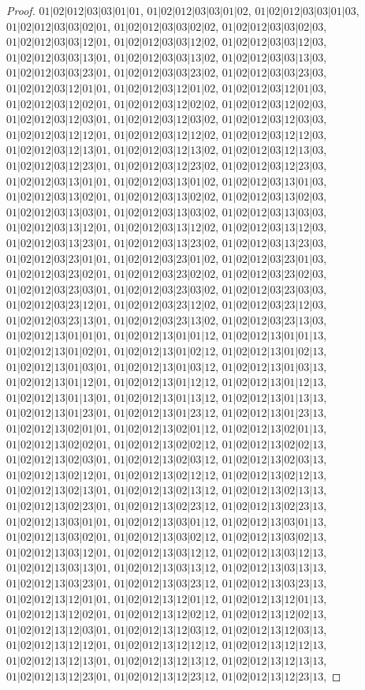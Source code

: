 \documentclass[12pt]{article}
\theoremstyle{plain}
\theoremstyle{definition}
\theoremstyle{remark}
\begin{document}
\begin{proof}
$01|02|012|03|03|01|01$, $01|02|012|03|03|01|02$, $01|02|012|03|03|01|03$, $01|02|012|03|03|02|01$, $01|02|012|03|03|02|02$, $01|02|012|03|03|02|03$, $01|02|012|03|03|12|01$, $01|02|012|03|03|12|02$, $01|02|012|03|03|12|03$, $01|02|012|03|03|13|01$, $01|02|012|03|03|13|02$, $01|02|012|03|03|13|03$, $01|02|012|03|03|23|01$, $01|02|012|03|03|23|02$, $01|02|012|03|03|23|03$, $01|02|012|03|12|01|01$, $01|02|012|03|12|01|02$, $01|02|012|03|12|01|03$, $01|02|012|03|12|02|01$, $01|02|012|03|12|02|02$, $01|02|012|03|12|02|03$, $01|02|012|03|12|03|01$, $01|02|012|03|12|03|02$, $01|02|012|03|12|03|03$, $01|02|012|03|12|12|01$, $01|02|012|03|12|12|02$, $01|02|012|03|12|12|03$, $01|02|012|03|12|13|01$, $01|02|012|03|12|13|02$, $01|02|012|03|12|13|03$, $01|02|012|03|12|23|01$, $01|02|012|03|12|23|02$, $01|02|012|03|12|23|03$, $01|02|012|03|13|01|01$, $01|02|012|03|13|01|02$, $01|02|012|03|13|01|03$, $01|02|012|03|13|02|01$, $01|02|012|03|13|02|02$, $01|02|012|03|13|02|03$, $01|02|012|03|13|03|01$, $01|02|012|03|13|03|02$, $01|02|012|03|13|03|03$, $01|02|012|03|13|12|01$, $01|02|012|03|13|12|02$, $01|02|012|03|13|12|03$, $01|02|012|03|13|23|01$, $01|02|012|03|13|23|02$, $01|02|012|03|13|23|03$, $01|02|012|03|23|01|01$, $01|02|012|03|23|01|02$, $01|02|012|03|23|01|03$, $01|02|012|03|23|02|01$, $01|02|012|03|23|02|02$, $01|02|012|03|23|02|03$, $01|02|012|03|23|03|01$, $01|02|012|03|23|03|02$, $01|02|012|03|23|03|03$, $01|02|012|03|23|12|01$, $01|02|012|03|23|12|02$, $01|02|012|03|23|12|03$, $01|02|012|03|23|13|01$, $01|02|012|03|23|13|02$, $01|02|012|03|23|13|03$, $01|02|012|13|01|01|01$, $01|02|012|13|01|01|12$, $01|02|012|13|01|01|13$, $01|02|012|13|01|02|01$, $01|02|012|13|01|02|12$, $01|02|012|13|01|02|13$, $01|02|012|13|01|03|01$, $01|02|012|13|01|03|12$, $01|02|012|13|01|03|13$, $01|02|012|13|01|12|01$, $01|02|012|13|01|12|12$, $01|02|012|13|01|12|13$, $01|02|012|13|01|13|01$, $01|02|012|13|01|13|12$, $01|02|012|13|01|13|13$, $01|02|012|13|01|23|01$, $01|02|012|13|01|23|12$, $01|02|012|13|01|23|13$, $01|02|012|13|02|01|01$, $01|02|012|13|02|01|12$, $01|02|012|13|02|01|13$, $01|02|012|13|02|02|01$, $01|02|012|13|02|02|12$, $01|02|012|13|02|02|13$, $01|02|012|13|02|03|01$, $01|02|012|13|02|03|12$, $01|02|012|13|02|03|13$, $01|02|012|13|02|12|01$, $01|02|012|13|02|12|12$, $01|02|012|13|02|12|13$, $01|02|012|13|02|13|01$, $01|02|012|13|02|13|12$, $01|02|012|13|02|13|13$, $01|02|012|13|02|23|01$, $01|02|012|13|02|23|12$, $01|02|012|13|02|23|13$, $01|02|012|13|03|01|01$, $01|02|012|13|03|01|12$, $01|02|012|13|03|01|13$, $01|02|012|13|03|02|01$, $01|02|012|13|03|02|12$, $01|02|012|13|03|02|13$, $01|02|012|13|03|12|01$, $01|02|012|13|03|12|12$, $01|02|012|13|03|12|13$, $01|02|012|13|03|13|01$, $01|02|012|13|03|13|12$, $01|02|012|13|03|13|13$, $01|02|012|13|03|23|01$, $01|02|012|13|03|23|12$, $01|02|012|13|03|23|13$, $01|02|012|13|12|01|01$, $01|02|012|13|12|01|12$, $01|02|012|13|12|01|13$, $01|02|012|13|12|02|01$, $01|02|012|13|12|02|12$, $01|02|012|13|12|02|13$, $01|02|012|13|12|03|01$, $01|02|012|13|12|03|12$, $01|02|012|13|12|03|13$, $01|02|012|13|12|12|01$, $01|02|012|13|12|12|12$, $01|02|012|13|12|12|13$, $01|02|012|13|12|13|01$, $01|02|012|13|12|13|12$, $01|02|012|13|12|13|13$, $01|02|012|13|12|23|01$, $01|02|012|13|12|23|12$, $01|02|012|13|12|23|13$, 
\end{proof}
\end{document}

